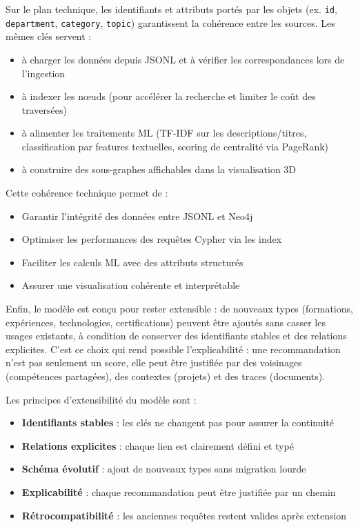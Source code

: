 \documentclass[12pt,a4paper]{report}
\begin{document}
Sur le plan technique, les identifiants et attributs portés par les objets (ex. \texttt{id}, \texttt{department}, \texttt{category}, \texttt{topic}) garantissent la cohérence entre les sources. Les mêmes clés servent :
\begin{itemize}
  \item à charger les données depuis JSONL et à vérifier les correspondances lors de l'ingestion
  \item à indexer les nœuds (pour accélérer la recherche et limiter le coût des traversées)
  \item à alimenter les traitements ML (TF-IDF sur les descriptions/titres, classification par features textuelles, scoring de centralité via PageRank)
  \item à construire des sous-graphes affichables dans la visualisation 3D
\end{itemize}

Cette cohérence technique permet de :
\begin{itemize}
  \item Garantir l'intégrité des données entre JSONL et Neo4j
  \item Optimiser les performances des requêtes Cypher via les index
  \item Faciliter les calculs ML avec des attributs structurés
  \item Assurer une visualisation cohérente et interprétable
\end{itemize}

Enfin, le modèle est conçu pour rester extensible : de nouveaux types (formations, expériences, technologies, certifications) peuvent être ajoutés sans casser les usages existants, à condition de conserver des identifiants stables et des relations explicites. C'est ce choix qui rend possible l'explicabilité : une recommandation n'est pas seulement un score, elle peut être justifiée par des voisinages (compétences partagées), des contextes (projets) et des traces (documents).

Les principes d'extensibilité du modèle sont :
\begin{itemize}
  \item \textbf{Identifiants stables} : les clés ne changent pas pour assurer la continuité
  \item \textbf{Relations explicites} : chaque lien est clairement défini et typé
  \item \textbf{Schéma évolutif} : ajout de nouveaux types sans migration lourde
  \item \textbf{Explicabilité} : chaque recommandation peut être justifiée par un chemin
  \item \textbf{Rétrocompatibilité} : les anciennes requêtes restent valides après extension
\end{itemize}
\end{document}
